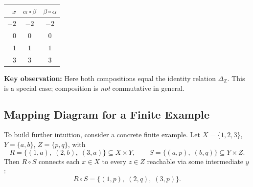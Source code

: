 \documentclass[12pt, a4paper]{article}
\newcommand{\Z}{\mathbb{Z}}
\begin{document}
\begin{center}
\renewcommand{\arraystretch}{1.1}
\begin{tabular}{r c c}
  \toprule
  $x$ & $\alpha \circ \beta$ & $\beta \circ \alpha$ \\
  \midrule
  $-2$ & $-2$ & $-2$ \\
  $0$  & $0$  & $0$  \\
  $1$  & $1$  & $1$  \\
  $3$  & $3$  & $3$  \\
  \bottomrule
\end{tabular}
\end{center}

\textbf{Key observation:} Here both compositions equal the identity relation $\Delta_{\Z}$. This is a special case; composition is \emph{not} commutative in general.

\begin{center}
\end{center}

\subsection*{Mapping Diagram for a Finite Example}

To build further intuition, consider a concrete finite example.
Let $X = \{1,2,3\}$, $Y = \{a,b\}$, $Z = \{p,q\}$, with
\[
  R = \{(1,a),\;(2,b),\;(3,a)\} \subseteq X \times Y,
  \qquad
  S = \{(a,p),\;(b,q)\} \subseteq Y \times Z.
\]
Then $R \circ S$ connects each $x \in X$ to every $z \in Z$ reachable via some intermediate $y$:
\[
  \boxed{R \circ S = \{(1,p),\;(2,q),\;(3,p)\}.}
\]
\end{document}
